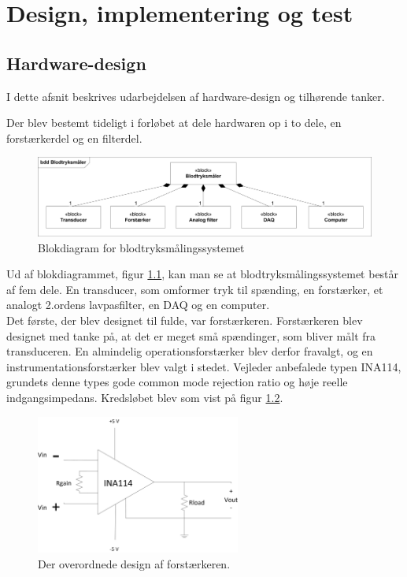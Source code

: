 \chapter{Design, implementering og test}
   
\section{Hardware-design}
I dette afsnit beskrives udarbejdelsen af hardware-design og tilhørende tanker.

Der blev bestemt tideligt i forløbet at dele hardwaren op i to dele, en forstærkerdel og en filterdel. 
\\
\begin{figure}[H]
	\centering
	\includegraphics[width=1\textwidth]{Figurer/Hardware/BDD1}
	\caption{Blokdiagram for blodtryksmålingssystemet}
	\label{BDD blodtryksmaaler}
\end{figure}

Ud af blokdiagrammet, figur \ref{BDD blodtryksmaaler}, kan man se at blodtryksmålingssystemet består af fem dele. En transducer, som omformer tryk til spænding, en forstærker, et analogt 2.ordens lavpasfilter, en DAQ og en computer. \\

Det første, der blev designet til fulde, var forstærkeren. Forstærkeren blev designet med tanke på, at det er meget små spændinger, som bliver målt fra transduceren. En almindelig operationsforstærker blev derfor fravalgt, og en instrumentationsforstærker blev valgt i stedet. Vejleder anbefalede typen INA114, grundets denne types gode common mode rejection ratio og høje reelle indgangsimpedans. Kredsløbet blev som vist på figur \ref{forstkreds}. \\

\begin{figure}[H]
	\centering
	\includegraphics[width=0.6\textwidth]{Figurer/Hardware/Forstaerker}
	\caption{Der overordnede design af forstærkeren.}
	\label{forstkreds}
\end{figure}

